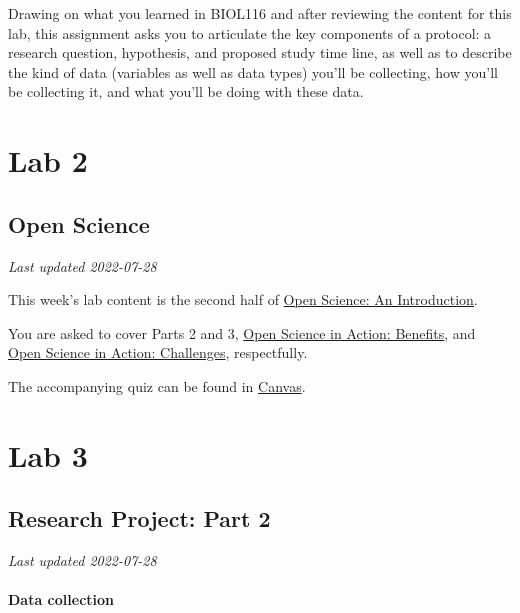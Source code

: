 \documentclass[
]{book}
\begin{document}
Drawing on what you learned in BIOL116 and after reviewing the content for this lab, this assignment asks you to articulate the key components of a protocol: a research question, hypothesis, and proposed study time line, as well as to describe the kind of data (variables as well as data types) you'll be collecting, how you'll be collecting it, and what you'll be doing with these data.

\hypertarget{part-lab-2}{%
\part*{Lab 2}\label{part-lab-2}}

\hypertarget{open-science}{%
\chapter*{Open Science}\label{open-science}}

\emph{Last updated 2022-07-28}

This week's lab content is the second half of \href{https://ubco-biology.github.io/OS-Introduction/}{Open Science: An Introduction}.

You are asked to cover Parts 2 and 3, \href{https://ubco-biology.github.io/OS-Introduction/open-science-in-action-benefits.html}{Open Science in Action: Benefits}, and \href{https://ubco-biology.github.io/OS-Introduction/open-science-in-action-challenges.html}{Open Science in Action: Challenges}, respectfully.

The accompanying quiz can be found in \href{https://canvas.ubc.ca/courses/90147}{Canvas}.

\hypertarget{part-lab-3}{%
\part*{Lab 3}\label{part-lab-3}}

\hypertarget{research-project-part-2}{%
\chapter*{Research Project: Part 2}\label{research-project-part-2}}

\emph{Last updated 2022-07-28}

\hypertarget{data-collection}{%
\subsection*{Data collection}\label{data-collection}}
\end{document}
